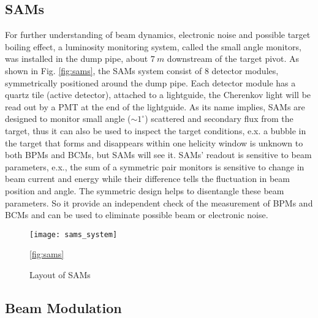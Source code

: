 \subsection{SAMs}
For further understanding of beam dynamics, electronic noise and possible target boiling
effect, a luminosity monitoring system, called the small angle monitors, was
installed in the dump pipe, about $7\ m$ downstream of the target pivot. As shown
in Fig. \ref{fig:sams}, the SAMs system consist of 8 detector modules, symmetrically 
positioned around the dump pipe. Each detector module has a quartz tile (active 
detector), attached to a lightguide, the Cherenkov light will be read out by a 
PMT at the end of the lightguide. 
As its name implies, SAMs are designed to monitor small angle ($\sim 1^\circ$)
scattered and secondary flux from the target, thus it can also be used to
inspect the target conditions, e.x. a bubble in the target that forms and disappears
within one helicity window is unknown to both BPMs and BCMs, but SAMs will see it.
SAMs' readout is sensitive to beam parameters,
e.x., the sum of a symmetric pair monitors is sensitive to change in beam current
and energy while their difference tells the fluctuation in beam position and angle.
The symmetric design helps to disentangle these beam parameters. So it provide
an independent check of the measurement of BPMs and BCMs and can be used to eliminate
possible beam or electronic noise.

\begin{figure}
    \centering
    \texttt{[image: sams\_system]}
    \caption{Layout of SAMs\cite{AJZ_thesis}}
    \ref{fig:sams}
\end{figure}

\subsection{Beam Modulation}
\begin{comment}
It is very important for PVES to control the systematic uncertainty, especially
the one from beam fluctuation (HCBA). Ideally, the electrons bunches with opposite
polarization should have exactly the same internsity and energy, hitting the target 
at the same place with the same angle, which is obviously impossible in reality. 
So we need to correct the false asymmetry introduce by the beam fluctuation. There are a
few methods to do the correction, one of them is the so called Beam modulation.
The idea is to introduce man-made fluctuations to the beam through the 
modulation system, then we can measure the changes in monitors and detectors 
to find the sensitivities of detectors to changes in energy, position and angle,
which will be used to correct the measured asymmetry.
\end{comment}

